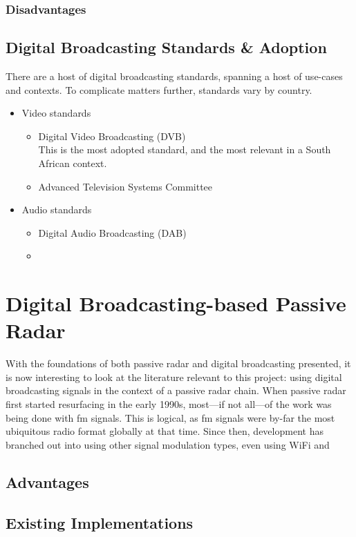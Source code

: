 \documentclass[class=report,11pt,crop=false]{standalone}
\begin{document}
\subsubsection{Disadvantages}

\subsection{Digital Broadcasting Standards \& Adoption}
There are a host of digital broadcasting standards, spanning a host of use-cases and contexts. To complicate matters further, standards vary by country.

\begin{itemize}
    \item Video standards
        \begin{itemize}
            \item Digital Video Broadcasting (DVB) \\
            This is the most adopted standard, and the most relevant in a South African context.
            \item Advanced Television Systems Committee
        \end{itemize}
    \item Audio standards
        \begin{itemize}
            \item Digital Audio Broadcasting (DAB) \\
            \item 
        \end{itemize}
\end{itemize}

\section{Digital Broadcasting-based Passive Radar}
With the foundations of both passive radar and digital broadcasting presented, it is now interesting to look at the literature relevant to this project: using digital broadcasting signals in the context of a passive radar chain. When passive radar first started resurfacing in the early 1990s, most---if not all---of the work was being done with \gls{fm} signals. This is logical, as \gls{fm} signals were by-far the most ubiquitous radio format globally at that time. Since then, development has branched out into using other signal modulation types, even using WiFi and 

\subsection{Advantages}
\subsection{Existing Implementations}




\ifstandalone

\printnoidxglossary[type=\acronymtype,nonumberlist]
\fi
\end{document}
